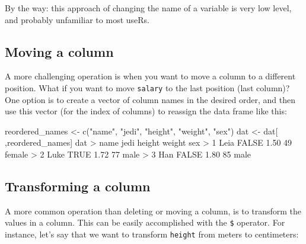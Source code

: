 \documentclass[
]{book}
\newenvironment{Shaded}{\begin{snugshade}}{\end{snugshade}}
\newcommand{\ConstantTok}[1]{\textcolor[rgb]{0.00,0.00,0.00}{#1}}
\newcommand{\DecValTok}[1]{\textcolor[rgb]{0.00,0.00,0.81}{#1}}
\newcommand{\FloatTok}[1]{\textcolor[rgb]{0.00,0.00,0.81}{#1}}
\newcommand{\FunctionTok}[1]{\textcolor[rgb]{0.00,0.00,0.00}{#1}}
\newcommand{\NormalTok}[1]{#1}
\newcommand{\OtherTok}[1]{\textcolor[rgb]{0.56,0.35,0.01}{#1}}
\newcommand{\SpecialCharTok}[1]{\textcolor[rgb]{0.00,0.00,0.00}{#1}}
\newcommand{\StringTok}[1]{\textcolor[rgb]{0.31,0.60,0.02}{#1}}
\begin{document}
By the way: this approach of changing the name of a variable is very low level,
and probably unfamiliar to most useRs.

\hypertarget{moving-a-column-1}{%
\subsection{Moving a column}\label{moving-a-column-1}}

A more challenging operation is when you want to move a column to a different
position. What if you want to move \texttt{salary} to the last position (last column)?
One option is to create a vector of column names in the desired order, and then
use this vector (for the index of columns) to reassign the data frame like this:

\begin{Shaded}
\begin{Highlighting}[]
\NormalTok{reordered\_names }\OtherTok{\textless{}{-}} \FunctionTok{c}\NormalTok{(}\StringTok{"name"}\NormalTok{, }\StringTok{"jedi"}\NormalTok{, }\StringTok{"height"}\NormalTok{, }\StringTok{"weight"}\NormalTok{, }\StringTok{"sex"}\NormalTok{)}
\NormalTok{dat }\OtherTok{\textless{}{-}}\NormalTok{ dat[ ,reordered\_names]}
\NormalTok{dat}
\SpecialCharTok{\textgreater{}}\NormalTok{   name  jedi height weight    sex}
\SpecialCharTok{\textgreater{}} \DecValTok{1}\NormalTok{ Leia }\ConstantTok{FALSE}   \FloatTok{1.50}     \DecValTok{49}\NormalTok{ female}
\SpecialCharTok{\textgreater{}} \DecValTok{2}\NormalTok{ Luke  }\ConstantTok{TRUE}   \FloatTok{1.72}     \DecValTok{77}\NormalTok{   male}
\SpecialCharTok{\textgreater{}} \DecValTok{3}\NormalTok{  Han }\ConstantTok{FALSE}   \FloatTok{1.80}     \DecValTok{85}\NormalTok{   male}
\end{Highlighting}
\end{Shaded}

\hypertarget{transforming-a-column}{%
\subsection{Transforming a column}\label{transforming-a-column}}

A more common operation than deleting or moving a column, is to transform the
values in a column. This can be easily accomplished with the \texttt{\$} operator.
For instance, let's say that we want to transform \texttt{height} from meters to
centimeters:
\end{document}
